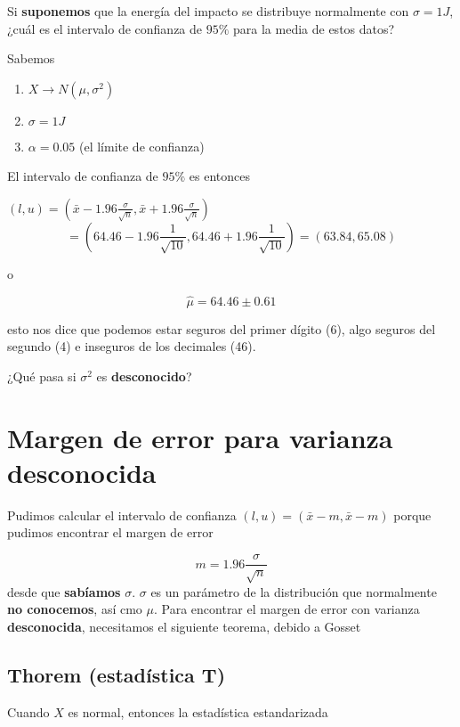 \documentclass[
]{book}
\providecommand{\tightlist}{%
  \setlength{\itemsep}{0pt}\setlength{\parskip}{0pt}}
\begin{document}
Si \textbf{suponemos} que la energía del impacto se distribuye normalmente con \(\sigma=1J\), ¿cuál es el intervalo de confianza de \(95\%\) para la media de estos datos?

Sabemos

\begin{enumerate}
\def\labelenumi{\arabic{enumi}.}
\tightlist
\item
  \(X \rightarrow N(\mu, \sigma^2)\)
\item
  \(\sigma=1J\)
\item
  \(\alpha=0.05\) (el límite de confianza)
\end{enumerate}

El intervalo de confianza de \(95\%\) es entonces

\((l,u)=(\bar{x}-1.96 \frac{\sigma}{\sqrt{n}}, \bar{x}+1.96 \frac{\sigma}{\sqrt{n}})\)
\[=(64.46-1.96 \frac{1}{\sqrt{10}}, 64.46+1.96 \frac{1}{\sqrt{10}})=(63.84,65.08)\]

o

\[\hat{\mu}=64.46 \pm 0.61\]

esto nos dice que podemos estar seguros del primer dígito (6), algo seguros del segundo (4) e inseguros de los decimales (46).

¿Qué pasa si \(\sigma^2\) es \textbf{desconocido}?

\hypertarget{margen-de-error-para-varianza-desconocida}{%
\section{Margen de error para varianza desconocida}\label{margen-de-error-para-varianza-desconocida}}

Pudimos calcular el intervalo de confianza \((l,u)=(\bar{x} -m, \bar{x} -m)\) porque pudimos encontrar el margen de error

\[m=1.96 \frac{\sigma}{\sqrt{n}}\]
desde que \textbf{sabíamos} \(\sigma\). \(\sigma\) es un parámetro de la distribución que normalmente \textbf{no conocemos}, así cmo \(\mu\). Para encontrar el margen de error con varianza \textbf{desconocida}, necesitamos el siguiente teorema, debido a Gosset

\hypertarget{thorem-estaduxedstica-t}{%
\subsection{Thorem (estadística T)}\label{thorem-estaduxedstica-t}}

Cuando \(X\) es normal, entonces la estadística estandarizada
\end{document}
